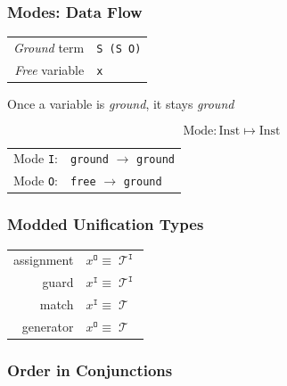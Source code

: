 \documentclass[xcolor={dvipsnames}, aspectratio=169]{beamer}
\DeclareMathOperator{\Term}{\mathcal{T}}
\DeclareMathOperator{\inmode}{\mathtt{I}}
\DeclareMathOperator{\outmode}{\mathtt{O}}
\begin{document}
\begin{frame}[fragile]
  \frametitle{Modes: Data Flow}
\begin{center}

\begin{tabular}{rl}
    \emph{Ground} term & \lstinline|S (S O)| \\
  \emph{Free} variable & \lstinline|x|
\end{tabular}

\vfill

Once a variable is \emph{ground}, it stays \emph{ground}
\end{center}

\vfill

\begin{center}
\[ \text{Mode} : \text{Inst} \mapsto \text{Inst} \] 
\vfill

\begin{tabular}{rl}
  Mode \lstinline|I|: & \lstinline|ground| $\rightarrow$ \lstinline|ground| \\
  Mode \lstinline|O|: & \lstinline|free| $\rightarrow$ \lstinline|ground|
\end{tabular}
\end{center}

\end{frame}

\begin{frame}[fragile]
  \frametitle{Modded Unification Types}

\begin{center}
\begin{tabular}{rl}
  assignment & $x^{\outmode} \equiv \Term^{\inmode} $ \\
  guard      & $x^{\inmode}  \equiv \Term^{\inmode} $ \\
  match      & $x^{\inmode}  \equiv \Term           $ \\
  generator  & $x^{\outmode} \equiv \Term           $
\end{tabular}
\end{center}

\end{frame}

\begin{frame}[fragile]
  \frametitle{Order in Conjunctions}



\end{frame}
\end{document}
